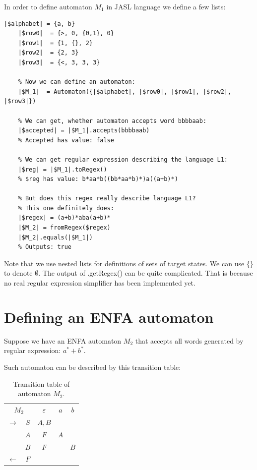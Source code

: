 \documentclass{ctuthesis}
\begin{document}
In order to define automaton $M_1$ in JASL language we define a few lists: 

\begin{minipage}{\linewidth}
\begin{lstlisting}[language = JASL]
	|$alphabet| = {a, b}
	|$row0|  = {>, 0, {0,1}, 0}
	|$row1|  = {1, {}, 2}
	|$row2|  = {2, 3}
	|$row3|  = {<, 3, 3, 3}
    
	% Now we can define an automaton:
	|$M_1|  = Automaton({|$alphabet|, |$row0|, |$row1|, |$row2|, |$row3|})

	% We can get, whether automaton accepts word bbbbaab:
	|$accepted| = |$M_1|.accepts(bbbbaab)   
	% Accepted has value: false 
	
	% We can get regular expression describing the language L1:
	|$reg| = |$M_1|.toRegex()
	% $reg has value: b*aa*b((bb*aa*b)*)a((a+b)*) 

	% But does this regex really describe language L1? 
	% This one definitely does:
	|$regex| = (a+b)*aba(a+b)*
	|$M_2| = fromRegex($regex)
	|$M_2|.equals(|$M_1|) 	
	% Outputs: true
\end{lstlisting}
\end{minipage}

Note that we use nested lists for definitions of sets of target states. We can use $\{\}$ to denote $\emptyset$. The output of .getRegex() can be quite complicated. That is because no real regular expression simplifier has been implemented yet.

\section{Defining an ENFA automaton}
\label{sec:example_ENFA}
Suppose we have an ENFA automaton $M_2$ that accepts all words generated by regular expression: $a^* + b^*$.

Such automaton can be described by this transition table:
\begin{table}[H]
\begin{ctucolortab}
\begin{tabular}{cc|ccc}
\multicolumn{2}{c}{$M_2$} & $\varepsilon$ & $a$ & $b$ \\\Midrule
$\rightarrow$ 	& $S$ & $A,B$  \\
				& $A$ & $F$ 	& $A$  \\
				& $B$ & $F$		& & $B$ \\
$\leftarrow$	& $F$ & 		&  
\end{tabular}
\end{ctucolortab}
\caption{Transition table of automaton $M_2$.}
\label{fig:examples_DFA_table}
\end{table} 
\end{document}
